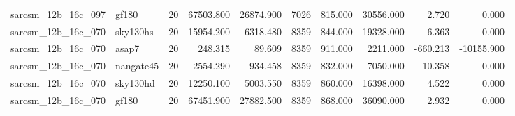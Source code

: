 \documentclass{article}
\begin{document}
\begin{longtable}{llrrrrrrrr}
sarcsm\_12b\_16c\_097 & gf180 & 20 & 67503.800 & 26874.900 & 7026 & 815.000 & 30556.000 & 2.720 & 0.000 \\
sarcsm\_12b\_16c\_070 & sky130hs & 20 & 15954.200 & 6318.480 & 8359 & 844.000 & 19328.000 & 6.363 & 0.000 \\
sarcsm\_12b\_16c\_070 & asap7 & 20 & 248.315 & 89.609 & 8359 & 911.000 & 2211.000 & -660.213 & -10155.900 \\
sarcsm\_12b\_16c\_070 & nangate45 & 20 & 2554.290 & 934.458 & 8359 & 832.000 & 7050.000 & 10.358 & 0.000 \\
sarcsm\_12b\_16c\_070 & sky130hd & 20 & 12250.100 & 5003.550 & 8359 & 860.000 & 16398.000 & 4.522 & 0.000 \\
sarcsm\_12b\_16c\_070 & gf180 & 20 & 67451.900 & 27882.500 & 8359 & 868.000 & 36090.000 & 2.932 & 0.000 \\
\end{longtable}
\end{document}

